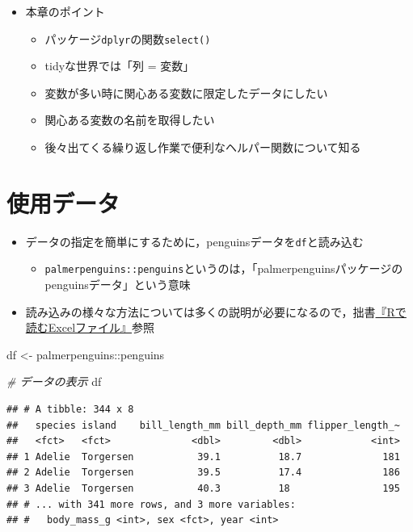 \documentclass[
  xelatex,ja=standard, b5paper]{bxjsbook}
\newenvironment{Shaded}{\begin{snugshade}}{\end{snugshade}}
\newcommand{\CommentTok}[1]{\textcolor[rgb]{0.56,0.35,0.01}{\textit{#1}}}
\newcommand{\NormalTok}[1]{#1}
\newcommand{\OtherTok}[1]{\textcolor[rgb]{0.56,0.35,0.01}{#1}}
\newcommand{\SpecialCharTok}[1]{\textcolor[rgb]{0.00,0.00,0.00}{#1}}
\providecommand{\tightlist}{%
  \setlength{\itemsep}{0pt}\setlength{\parskip}{0pt}}
\begin{document}
\begin{itemize}
\tightlist
\item
  本章のポイント

  \begin{itemize}
  \tightlist
  \item
    パッケージ\texttt{dplyr}の関数\texttt{select()}
  \item
    tidyな世界では「列 = 変数」
  \item
    変数が多い時に関心ある変数に限定したデータにしたい
  \item
    関心ある変数の名前を取得したい
  \item
    後々出てくる繰り返し作業で便利なヘルパー関数について知る
  \end{itemize}
\end{itemize}

\hypertarget{select-read}{%
\section{使用データ}\label{select-read}}

\begin{itemize}
\tightlist
\item
  データの指定を簡単にするために，penguinsデータを\texttt{df}と読み込む

  \begin{itemize}
  \tightlist
  \item
    \texttt{palmerpenguins::penguins}というのは，「palmerpenguinsパッケージのpenguinsデータ」という意味
  \end{itemize}
\item
  読み込みの様々な方法については多くの説明が必要になるので，拙書\href{https://techbookfest.org/product/4794168259903488?productVariantID=5913872206659584}{『Rで読むExcelファイル』}参照
\end{itemize}

\begin{Shaded}
\begin{Highlighting}[]
\NormalTok{df }\OtherTok{\textless{}{-}} 
\NormalTok{  palmerpenguins}\SpecialCharTok{::}\NormalTok{penguins}

\CommentTok{\# データの表示  }
\NormalTok{df }
\end{Highlighting}
\end{Shaded}

\begin{verbatim}
## # A tibble: 344 x 8
##   species island    bill_length_mm bill_depth_mm flipper_length_~
##   <fct>   <fct>              <dbl>         <dbl>            <int>
## 1 Adelie  Torgersen           39.1          18.7              181
## 2 Adelie  Torgersen           39.5          17.4              186
## 3 Adelie  Torgersen           40.3          18                195
## # ... with 341 more rows, and 3 more variables:
## #   body_mass_g <int>, sex <fct>, year <int>
\end{verbatim}
\end{document}
